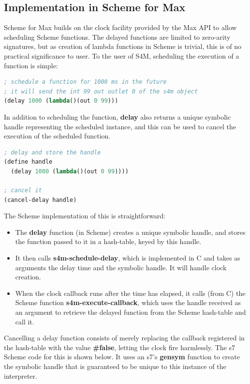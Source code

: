 \documentclass[acmsmall]{acmart}
\begin{document}
\subsection{Implementation in Scheme for Max}

Scheme for Max builds on the clock facility provided by the Max API to allow scheduling
Scheme functions. The delayed functions are limited to zero-arity signatures, but as
creation of lambda functions in Scheme is trivial, this is of no practical significance to 
user. To the user of S4M, scheduling the execution of a function is simple:

\begin{lstlisting}[language=lisp]
; schedule a function for 1000 ms in the future
; it will send the int 99 out outlet 0 of the s4m object
(delay 1000 (lambda()(out 0 99)))
\end{lstlisting}

In addition to scheduling the function, \textbf{delay} also returns a unique
symbolic handle representing the scheduled instance, and this can be used to 
cancel the execution of the scheduled function.

\begin{lstlisting}[language=lisp]
; delay and store the handle
(define handle 
  (delay 1000 (lambda()(out 0 99))))

; cancel it
(cancel-delay handle)
\end{lstlisting}

The Scheme implementation of this is straightforward:

\begin{itemize}
\item The \textbf{delay} function (in Scheme) creates a unique symbolic handle, and stores the 
  function passed to it in a hash-table, keyed by this handle.
\item It then calls \textbf{s4m-schedule-delay}, which is implemented
  in C and takes as arguments the delay time and the symbolic handle. It will handle 
  clock creation.
\item When the clock callback runs after the time has elapsed, it calls (from C) the Scheme function 
  \textbf{s4m-execute-callback}, which uses the handle received as an argument 
  to retrieve the delayed function from the Scheme hash-table and call it.
\end{itemize}

Cancelling a delay function consists of merely replacing the callback registered
in the hash-table with the value \textbf{\#false}, letting the clock fire harmlessly.
The s7 Scheme code for this is shown below. It uses an s7's \textbf{gensym} function to create the
symbolic handle that is guaranteed to be unique to this instance of the interpreter.
\end{document}
